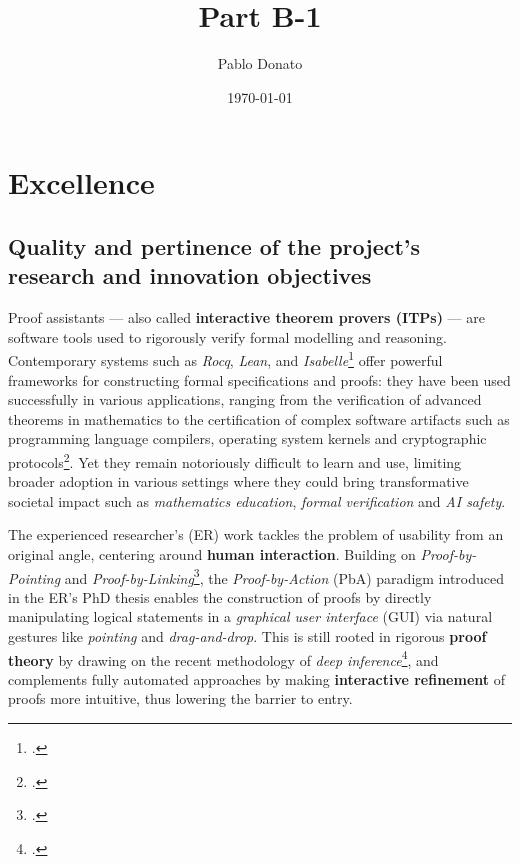 \documentclass[12pt,draftproposal]{msca-pf}
\title{Part B-1}
\author{Pablo Donato}
\date{\today}
\begin{document}
\maketitle



\section{Excellence }
\label{sc:excellence}

\subsection{Quality and pertinence of the project's research and innovation objectives}
\label{ssc:excellence:quality}

Proof assistants --- also called \textbf{interactive theorem provers (ITPs)} --- are software tools
used to rigorously verify formal modelling and reasoning. Contemporary systems such as \emph{Rocq},
\emph{Lean}, and
\emph{Isabelle}\footcite{the_rocq_development_team_2025_15149629,10.1007/978-3-030-79876-5_37,nipkow2002isabelle}
offer powerful frameworks for constructing formal specifications and proofs: they have been used
successfully in various applications, ranging from the verification of advanced theorems in
mathematics to the certification of complex software artifacts such as programming language
compilers, operating system kernels and cryptographic
protocols\footcite{gonthierFormalProofFour2008,leroyFormalVerificationRealistic2009,kleinSeL4FormalVerification2009,Barthe2014}.
Yet they remain notoriously difficult to learn and use, limiting broader adoption in various
settings where they could bring transformative societal impact such as \emph{mathematics education},
\emph{formal verification} and \emph{AI safety}.

The experienced researcher's (ER) work tackles the problem of usability from an original angle,
centering around \textbf{human interaction}. Building on \emph{Proof-by-Pointing} and
\emph{Proof-by-Linking}\footcite{PbP,Chaudhuri2013}, the \emph{Proof-by-Action} (PbA) paradigm
introduced in the ER's PhD thesis enables the construction of proofs by directly manipulating
logical statements in a \emph{graphical user interface} (GUI) via natural gestures like
\emph{pointing} and \emph{drag-and-drop}. This is still rooted in rigorous \textbf{proof theory} by
drawing on the recent methodology of \emph{deep inference}\footcite{deep_inference}, and complements
fully automated approaches by making \textbf{interactive refinement} of proofs more intuitive, thus
lowering the barrier to entry.
\end{document}
